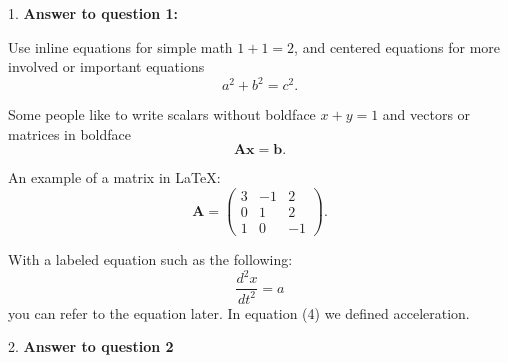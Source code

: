 \documentclass{article}
\begin{document}
1. \textbf{Answer to question 1:}

Use inline equations for simple math \( 1 + 1 = 2 \), and centered equations for more involved or important equations
\begin{equation}
    a^2 + b^2 = c^2.
\end{equation}

Some people like to write scalars without boldface \( x + y = 1 \) and vectors or matrices in boldface
\begin{equation}
    \bm{A} \bm{x} = \bm{b}.
\end{equation}

An example of a matrix in \LaTeX:
\begin{equation}
    \bm{A} = 
    \begin{pmatrix}
        3 & -1 & 2 \\
        0 & 1 & 2 \\
        1 & 0 & -1
    \end{pmatrix}.
\end{equation}

With a labeled equation such as the following:
\begin{equation}
    \frac{d^2x}{dt^2} = a
\end{equation}
you can refer to the equation later. In equation (4) we defined acceleration.

\vspace{1.5em}

2. \textbf{Answer to question 2}
\end{document}
